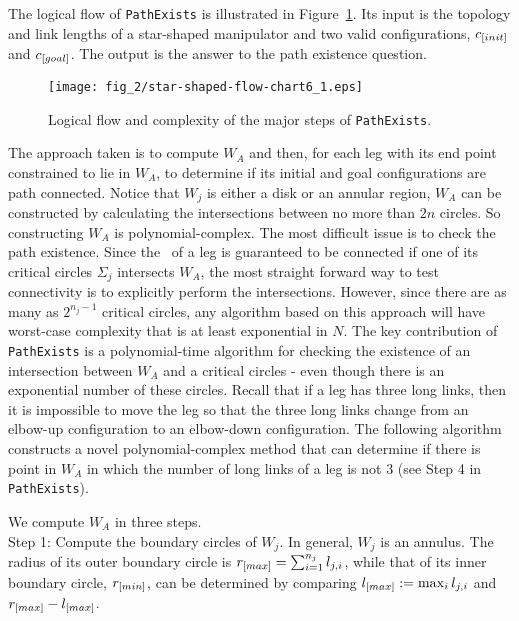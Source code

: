 The logical flow of {\tt PathExists} is illustrated in
Figure~\ref{PathExists}. Its input is the topology and link
lengths of a star-shaped manipulator and two valid configurations,
$c_{\textit{\rm{[}}init]}$ and $c_{\textit{\rm{[}}goal]}$.  The output is the answer
to the path existence question.
%
\begin{figure}
  \centering
  \texttt{[image: fig\_2/star-shaped-flow-chart6\_1.eps]}
  \caption{Logical flow and complexity of the major steps
  of {\tt PathExists}.}
  \label{PathExists}
\end{figure}
%
The approach taken is to compute $W_A$ and then, for each leg with
its end point constrained to lie in $W_A$, to determine if its
initial and goal configurations are path connected. Notice that
$W_j$ is either a disk or an annular region,  $W_A$ can be
constructed by calculating the intersections between no more than
$2n$ circles. So constructing $W_A$ is polynomial-complex.  The
most difficult issue is to check the path existence. Since the
\cspace \ of a leg is guaranteed to be connected if one of its
critical circles $\Sigma_j$ intersects $W_A$, the most straight
forward way to test connectivity is to explicitly perform the
intersections. However, since there are as many as $2^{n_j-1}$
critical circles, any algorithm based on this approach will have
worst-case complexity that is at least exponential in $N$. The key
contribution of {\tt PathExists} is a polynomial-time algorithm
for checking the existence of an intersection between $W_A$ and a
critical circles - even though there is an exponential number of
these circles.  Recall that if a leg has three long links, then it
is impossible to move the leg so that the three long links change
from an elbow-up configuration to an elbow-down configuration. The
following algorithm constructs a novel polynomial-complex method
that can determine if there is point in $W_A$ in which the number
of long links of a leg is not $3$ (see Step 4 in {\tt
PathExists}).

\medskip

\noindent {}
We compute $W_A$ in three steps.\\
Step 1: Compute the boundary circles of $W_j$. In general, $W_j$
is an
annulus. The radius of its outer boundary circle is
$r_{\textit{\rm{[}}max]}=\sum_{i=1}^{n_j} l_{j,i}$, while that of its inner
boundary circle, $r_{\textit{\rm{[}}min]}$, can be determined by comparing
$l_{\textit{\rm{[}}max]}:=\max_i l_{j,i}$ and
$r_{\textit{\rm{[}}max]}-l_{\textit{\rm{[}}max]}$.

